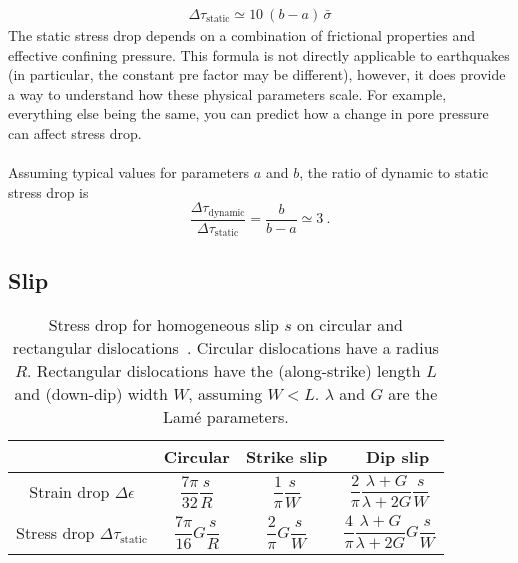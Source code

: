 \documentclass[letterpaper,12pt,]{memoir}
\begin{document}
\begin{equation}
\boxed{\begin{aligned}
\Delta\tau_\text{static}\simeq 10~(b-a)\,\bar{\sigma}
\end{aligned}}
\end{equation}
The static stress drop depends on a combination of frictional properties and effective confining pressure. This formula is not directly applicable to earthquakes (in particular, the constant pre factor may be different), however, it does provide a way to understand how these physical parameters scale. For example, everything else being the same, you can predict how a change in pore pressure can affect stress drop.\\
\\
Assuming typical values for parameters $a$ and $b$, the ratio of dynamic to static stress drop is 
\begin{equation}
\frac{\Delta\tau_\text{dynamic}}{\Delta\tau_\text{static}}=\frac{b}{b-a}\simeq 3~.
\end{equation}


\subsection{Slip}

\begin{table}
\centering
 \def\arraystretch{2}
\begin{tabular*}{0.85\columnwidth}{cccc}
 & Circular & Strike slip & $\quad$Dip slip \\
\hline
Strain drop $\Delta\epsilon$ & \parbox{1cm}{\begin{equation*} \frac{7\pi}{32}\frac{s}{R} \end{equation*}}  & \parbox{1cm}{\begin{equation*}\frac{1}{\pi}\frac{s}{W}\end{equation*}} & \parbox{1.5cm}{\begin{equation*}\frac{2}{\pi}\frac{\lambda+G}{\lambda+2G}\frac{s}{W}\end{equation*}}\\
Stress drop $\Delta\tau_\text{static}$ & \parbox{1cm}{\begin{equation*}\frac{7\pi}{16}G\frac{s}{R}\end{equation*}}  & \parbox{1cm}{\begin{equation*}\frac{2}{\pi}G\frac{s}{W}\end{equation*}} & \parbox{1.5cm}{\begin{equation*}\frac{4}{\pi}\frac{\lambda+G}{\lambda+2G}G\frac{s}{W}\end{equation*}}\\
\end{tabular*}
\vspace{0.5cm}
\caption{Stress drop for homogeneous slip $s$ on circular and rectangular dislocations~\citep{kanamori&anderson75}. Circular dislocations have a radius $R$. Rectangular dislocations have the (along-strike) length $L$ and (down-dip) width $W$, assuming $W<L$. $\lambda$ and $G$ are the Lam\'{e} parameters.}
\label{tbl:stress-strain-drops}
\end{table}
\end{document}
